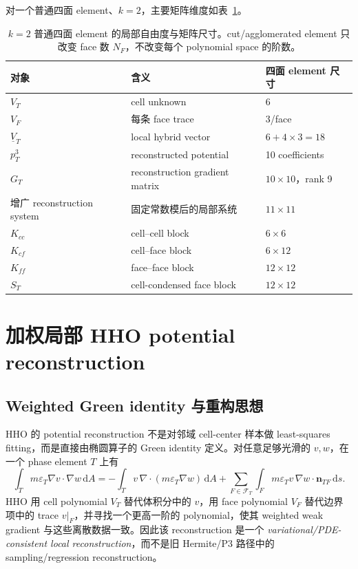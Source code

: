 \documentclass[UTF8,a4paper,11pt]{ctexart}
\newcommand{\dd}{\mathrm{d}}
\newcommand{\eps}{\varepsilon}
\newcommand{\vct}[1]{\bm{#1}}
\begin{document}
对一个普通四面 element、\(k=2\)，主要矩阵维度如表~\ref{tab:hho_local_dimensions}。
\begin{table}[htbp]
\centering
\small
\begin{tabular}{lll}
\toprule
对象 & 含义 & 四面 element 尺寸\\
\midrule
\(V_T\) & cell unknown & 6\\
\(V_F\) & 每条 face trace & 3/face\\
\(\underline V_T\) & local hybrid vector & \(6+4\times3=18\)\\
\(p_T^3\) & reconstructed potential & 10 coefficients\\
\(G_T\) & reconstruction gradient matrix & \(10\times10\)，rank 9\\
增广 reconstruction system & 固定常数模后的局部系统 & \(11\times11\)\\
\(K_{cc}\) & cell--cell block & \(6\times6\)\\
\(K_{cf}\) & cell--face block & \(6\times12\)\\
\(K_{ff}\) & face--face block & \(12\times12\)\\
\(S_T\) & cell-condensed face block & \(12\times12\)\\
\bottomrule
\end{tabular}
\caption{\(k=2\) 普通四面 element 的局部自由度与矩阵尺寸。cut/agglomerated element 只改变 face 数 \(N_F\)，不改变每个 polynomial space 的阶数。}
\label{tab:hho_local_dimensions}
\end{table}

\section{加权局部 HHO potential reconstruction}

\subsection{Weighted Green identity 与重构思想}

HHO 的 potential reconstruction 不是对邻域 cell-center 样本做 least-squares fitting，而是直接由椭圆算子的 Green identity 定义。对任意足够光滑的 \(v,w\)，在一个 phase element \(T\) 上有
\begin{equation}
\boxed{
\int_Tm\eps_T\nabla v\cdot\nabla w\,\dd A
=
-\int_Tv\,\nabla\cdot(m\eps_T\nabla w)\,\dd A
+
\sum_{F\in\mathcal F_T}
\int_Fm\eps_Tv\,\nabla w\cdot\vct n_{TF}\,\dd s .
}
\label{eq:weighted_green_identity}
\end{equation}
HHO 用 cell polynomial \(V_T\) 替代体积分中的 \(v\)，用 face polynomial \(V_F\) 替代边界项中的 trace \(v|_F\)，并寻找一个更高一阶的 polynomial，使其 weighted weak gradient 与这些离散数据一致。因此该 reconstruction 是一个 \emph{variational/PDE-consistent local reconstruction}，而不是旧 Hermite/P3 路径中的 sampling/regression reconstruction。
\end{document}
